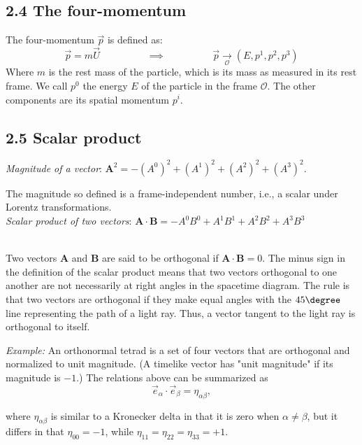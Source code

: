 \documentclass[12pt]{book}
\begin{document}
    \subsection{2.4 The four-momentum}
        The four-momentum \(\vec{p}\) is defined as:
        \[
            \vec{p} = m \vec{U} \hspace{2cm} \implies \hspace{2cm} \vec{p} \underset{\mathcal{O}}{\rightarrow} (E, p^1, p^2, p^3)
        \]
        Where \(m\) is the rest mass of the particle, which is its mass as measured in its rest frame. We call \(p^0\) the energy \(E\) of the particle in the frame \(\mathcal{O}\). The other components are its spatial momentum \(p^i\).
        
    \subsection{2.5 Scalar product}
        
        \textit{Magnitude of a vector}: \(\mathbf{A}^2 = -(A^0)^2 + (A^1)^2 + (A^2)^2 + (A^3)^2\). 
        
        The magnitude so defined is a frame-independent number, i.e., a scalar under Lorentz transformations.\\ 
        
         \textit{Scalar product of two vectors}: \(\mathbf{A} \cdot \mathbf{B} = -A^0B^0 + A^1B^1 + A^2B^2 + A^3B^3\)
         
        \\Two vectors \( \mathbf{A} \) and \( \mathbf{B} \) are said to be orthogonal if \( \mathbf{A} \cdot \mathbf{B} = 0 \). The minus sign in the definition of the scalar product means that two vectors orthogonal to one another are not necessarily at right angles in the spacetime diagram. The rule is that two vectors are orthogonal if they make equal angles with the \(45 \degree \) line representing the path of a light ray. Thus, a vector tangent to the light ray is orthogonal to itself.
    
        \textit{Example:} An orthonormal tetrad is a set of four vectors that are orthogonal and normalized to unit magnitude. (A timelike vector has "unit magnitude" if its magnitude is \(-1\).) The relations above can be summarized as
        \[
        \vec{e}_\alpha \cdot \vec{e}_\beta = \eta_{\alpha\beta},
        \]
        
        where \(\eta_{\alpha\beta}\) is similar to a Kronecker delta in that it is zero when \(\alpha \neq \beta\), but it differs in that \(\eta_{00} = -1\), while \(\eta_{11} = \eta_{22} = \eta_{33} = +1\).
    
\end{document}
